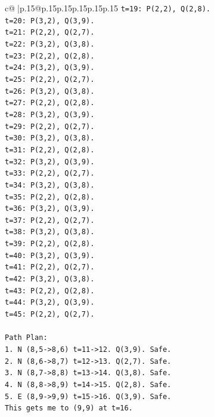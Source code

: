 \documentclass{article}
\begin{document}
{\begin{supertabular}{c@{$\;$}|p{.15\linewidth}@{}p{.15\linewidth}p{.15\linewidth}p{.15\linewidth}p{.15\linewidth}p{.15\linewidth}}
{{{\texttt{t=19: P(2,2), Q(2,8).} \\
\texttt{t=20: P(3,2), Q(3,9).} \\
\texttt{t=21: P(2,2), Q(2,7).} \\
\texttt{t=22: P(3,2), Q(3,8).} \\
\texttt{t=23: P(2,2), Q(2,8).} \\
\texttt{t=24: P(3,2), Q(3,9).} \\
\texttt{t=25: P(2,2), Q(2,7).} \\
\texttt{t=26: P(3,2), Q(3,8).} \\
\texttt{t=27: P(2,2), Q(2,8).} \\
\texttt{t=28: P(3,2), Q(3,9).} \\
\texttt{t=29: P(2,2), Q(2,7).} \\
\texttt{t=30: P(3,2), Q(3,8).} \\
\texttt{t=31: P(2,2), Q(2,8).} \\
\texttt{t=32: P(3,2), Q(3,9).} \\
\texttt{t=33: P(2,2), Q(2,7).} \\
\texttt{t=34: P(3,2), Q(3,8).} \\
\texttt{t=35: P(2,2), Q(2,8).} \\
\texttt{t=36: P(3,2), Q(3,9).} \\
\texttt{t=37: P(2,2), Q(2,7).} \\
\texttt{t=38: P(3,2), Q(3,8).} \\
\texttt{t=39: P(2,2), Q(2,8).} \\
\texttt{t=40: P(3,2), Q(3,9).} \\
\texttt{t=41: P(2,2), Q(2,7).} \\
\texttt{t=42: P(3,2), Q(3,8).} \\
\texttt{t=43: P(2,2), Q(2,8).} \\
\texttt{t=44: P(3,2), Q(3,9).} \\
\texttt{t=45: P(2,2), Q(2,7).} \\
\\ 
\texttt{Path Plan:} \\
\texttt{1. N (8,5{-}>8,6) t=11{-}>12. Q(3,9). Safe.} \\
\texttt{2. N (8,6{-}>8,7) t=12{-}>13. Q(2,7). Safe.} \\
\texttt{3. N (8,7{-}>8,8) t=13{-}>14. Q(3,8). Safe.} \\
\texttt{4. N (8,8{-}>8,9) t=14{-}>15. Q(2,8). Safe.} \\
\texttt{5. E (8,9{-}>9,9) t=15{-}>16. Q(3,9). Safe.} \\
\texttt{This gets me to (9,9) at t=16.} \\
}}}
\end{supertabular}}
\end{document}
